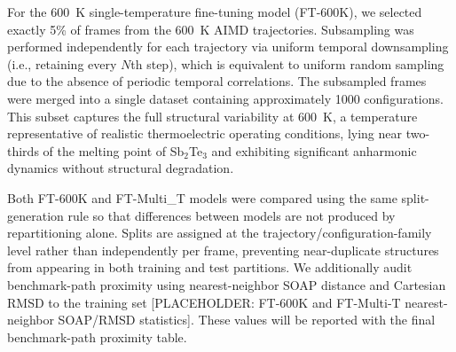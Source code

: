 \documentclass[pdflatex,sn-mathphys-num]{sn-jnl}%
\providecommand{\reviewermap}[3]{}
\theoremstyle{thmstyleone}%
\theoremstyle{thmstyletwo}%
\theoremstyle{thmstylethree}%
\begin{document}
For the 600~K single-temperature fine-tuning model (FT-600K), we selected exactly 5\% of frames from the 600~K AIMD trajectories. Subsampling was performed independently for each trajectory via uniform temporal downsampling (i.e., retaining every $N$th step), which is equivalent to uniform random sampling due to the absence of periodic temporal correlations. The subsampled frames were merged into a single dataset containing approximately 1000 configurations. This subset captures the full structural variability at 600~K, a temperature representative of realistic thermoelectric operating conditions, lying near two-thirds of the melting point of Sb$_2$Te$_3$ and exhibiting significant anharmonic dynamics without structural degradation.

\reviewermap{REV-A2/REV-C10}{pending}{Grouped split and train/test overlap audit must be documented once SOAP/RMSD values are available.}
Both FT-600K and FT-Multi\_T models were compared using the same split-generation rule so that differences between models are not produced by repartitioning alone. Splits are assigned at the trajectory/configuration-family level rather than independently per frame, preventing near-duplicate structures from appearing in both training and test partitions. We additionally audit benchmark-path proximity using nearest-neighbor SOAP distance and Cartesian RMSD to the training set [PLACEHOLDER: FT-600K and FT-Multi-T nearest-neighbor SOAP/RMSD statistics]. These values will be reported with the final benchmark-path proximity table.





\end{document}
